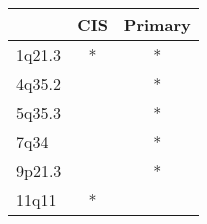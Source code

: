 \begin{tabular}{lcc}
\toprule
{} & CIS & Primary \\
\midrule
1q21.3 &   * &       * \\
4q35.2 &     &       * \\
5q35.3 &     &       * \\
7q34   &     &       * \\
9p21.3 &     &       * \\
11q11  &   * &         \\
\bottomrule
\end{tabular}
